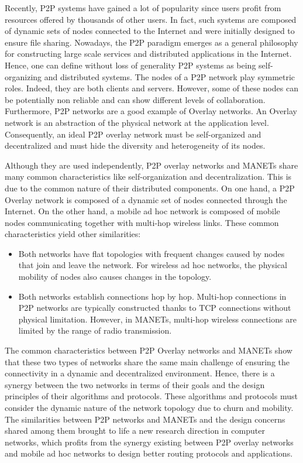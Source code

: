 Recently, P2P systems have gained a lot of popularity since users profit from resources offered by thousands of other users. In fact, such systems are composed of dynamic sets of nodes connected to the Internet and were initially designed to ensure file sharing. Nowadays, the P2P paradigm emerges as a general philosophy for constructing large scale services and distributed applications in the Internet. Hence, one can define without loss of generality P2P systems as being self-organizing and distributed systems. The nodes of a P2P network play symmetric roles. Indeed, they are both clients and servers. However, some of these nodes can be potentially non reliable and can show different levels of collaboration. Furthermore, P2P networks are a good example of Overlay networks. An Overlay network is an abstraction of the physical network at the application level. Consequently, an ideal P2P overlay network must be self-organized and decentralized and must hide the diversity and heterogeneity of its nodes.

Although they are used independently, P2P overlay networks and MANETs share many common characteristics like self-organization and decentralization. This is due to the common nature of their distributed components. On one hand, a P2P Overlay network is composed of a dynamic set of nodes connected through the Internet. On the other hand, a mobile ad hoc network is composed of mobile nodes communicating together with multi-hop wireless links. These common characteristics yield other similarities:

\begin{itemize}
\item{Both networks have flat topologies with frequent changes caused by nodes that join and leave the network. For wireless ad hoc networks, the physical mobility of nodes also causes changes in the topology.}
\item{Both networks establish connections hop by hop. Multi-hop connections in P2P networks are typically constructed thanks to TCP connections without physical limitation. However, in MANETs, multi-hop wireless connections are limited by the range of radio transmission.}
\end{itemize}

The common characteristics between P2P Overlay networks and MANETs show that these two types of networks share the same main challenge of ensuring the connectivity in a dynamic and decentralized environment. Hence, there is a synergy between the two networks in terms of their goals and the design principles of their algorithms and protocols.  These algorithms and protocols must consider the dynamic nature of the network topology due to churn and mobility. The similarities between P2P networks and MANETs and the design concerns shared among them brought to life a new research direction in computer networks, which profits from the synergy existing between P2P overlay networks and mobile ad hoc networks to design better routing protocols and applications.

